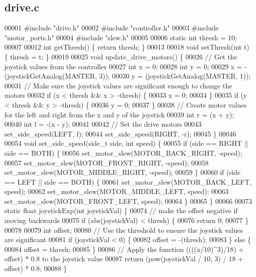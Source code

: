 \subsection{drive.\+c}
\label{drive_8c_source}

\begin{DoxyCode}
00001 \textcolor{preprocessor}{#include "drive.h"}
00002 \textcolor{preprocessor}{#include "controller.h"}
00003 \textcolor{preprocessor}{#include "motor_ports.h"}
00004 \textcolor{preprocessor}{#include "slew.h"}
00005 
00006 \textcolor{keyword}{static} \textcolor{keywordtype}{int} thresh = 10;
00007 
00012 \textcolor{keywordtype}{int} getThresh() \{ \textcolor{keywordflow}{return} thresh; \}
00013 
00018 \textcolor{keywordtype}{void} setThresh(\textcolor{keywordtype}{int} t) \{ thresh = t; \}
00019 
00025 \textcolor{keywordtype}{void} update_drive_motors() \{
00026   \textcolor{comment}{// Get the joystick values from the controller}
00027   \textcolor{keywordtype}{int} x = 0;
00028   \textcolor{keywordtype}{int} y = 0;
00029   x = -(joystickGetAnalog(MASTER, 3));
00030   y = (joystickGetAnalog(MASTER, 1));
00031   \textcolor{comment}{// Make sure the joystick values are significant enough to change the motors}
00032   \textcolor{keywordflow}{if} (x < thresh && x > -thresh) \{
00033     x = 0;
00034   \}
00035   \textcolor{keywordflow}{if} (y < thresh && y > -thresh) \{
00036     y = 0;
00037   \}
00038   \textcolor{comment}{// Create motor values for the left and right from the x and y of the joystick}
00039   \textcolor{keywordtype}{int} r = (x + y);
00040   \textcolor{keywordtype}{int} l = -(x - y);
00041 
00042   \textcolor{comment}{// Set the drive motors}
00043   set_side_speed(LEFT, l);
00044   set_side_speed(RIGHT, -r);
00045 \}
00046 
00054 \textcolor{keywordtype}{void} set_side_speed(side_t side, \textcolor{keywordtype}{int} speed) \{
00055   \textcolor{keywordflow}{if} (side == RIGHT || side == BOTH) \{
00056     set_motor_slew(MOTOR\_BACK\_RIGHT, -speed);
00057     set_motor_slew(MOTOR\_FRONT\_RIGHT, -speed);
00058     set_motor_slew(MOTOR\_MIDDLE\_RIGHT, -speed);
00059   \}
00060   \textcolor{keywordflow}{if} (side == LEFT || side == BOTH) \{
00061     set_motor_slew(MOTOR\_BACK\_LEFT, speed);
00062     set_motor_slew(MOTOR\_MIDDLE\_LEFT, speed);
00063     set_motor_slew(MOTOR\_FRONT\_LEFT, speed);
00064   \}
00065 \}
00066 
00073 \textcolor{keyword}{static} \textcolor{keywordtype}{float} joystickExp(\textcolor{keywordtype}{int} joystickVal) \{
00074   \textcolor{comment}{// make the offset negative if moving backwards}
00075   \textcolor{keywordflow}{if} (abs(joystickVal) < thresh) \{
00076     \textcolor{keywordflow}{return} 0;
00077   \}
00078 
00079   \textcolor{keywordtype}{int} offset;
00080   \textcolor{comment}{// Use the threshold to ensure the joystick values are significant}
00081   \textcolor{keywordflow}{if} (joystickVal < 0) \{
00082     offset = -(thresh);
00083   \} \textcolor{keywordflow}{else} \{
00084     offset = thresh;
00085   \}
00086   \textcolor{comment}{// Apply the function ((((x/10)^3)/18) + offset) * 0.8 to the joystick value}
00087   \textcolor{keywordflow}{return} (pow(joystickVal / 10, 3) / 18 + offset) * 0.8;
00088 \}
\end{DoxyCode}
